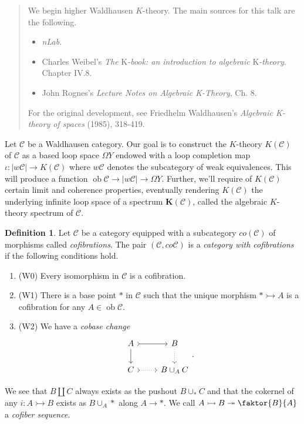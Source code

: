 \documentclass[10pt,letterpaper,cm]{nupset}
\theoremstyle{definition}
\newtheorem{definition}{Definition}
\theoremstyle{theorem}
\theoremstyle{remark}
\newcommand{\1}{\mathbf{1}}
\renewcommand{\c}{\mathscr{C}}
\newcommand{\0}{\vec 0}
\DeclareMathOperator{\ob}{ob}
\begin{document}
\begin{abstract}
We begin higher Waldhausen $K$-theory. The main sources for this talk are the following.
\begin{itemize}
\item \textit{nLab}.
\item Charles Weibel's \textit{The} K\textit{-book: an introduction to algebraic} K\textit{-theory}.  Chapter IV.8.
\item John Rognes's \textit{Lecture Notes on Algebraic K-Theory}, Ch. 8.
\end{itemize}
For the original development, see Friedhelm Waldhausen's \textit{Algebraic K-theory of spaces} (1985), 318-419. 
\end{abstract}


Let $\c$ be a Waldhausen category. Our goal is to construct the $K$-theory $K(\c)$ of $\c$ as a based loop space $\Omega Y$ endowed with a loop completion map $ \iota : |w \c| \to K(\c)$ where $w \c$ denotes the subcategory of weak equivalences. This will produce a function $\ob \c \to |w \c| \to \Omega Y$. Further, we'll require of $K(\c)$ certain limit and coherence properties, eventually rendering $K(\c)$ the underlying infinite loop space of a spectrum $\mathbf{K}(\c)$, called the algebraic $K$-theory spectrum of $\c$.


\begin{definition}
Let $\c$ be a category equipped with a subcategory $co(\c)$ of morphisms called \textit{cofibrations}. The pair $(\c, co\c)$ is a \textit{category with cofibrations} if the following conditions hold.
\begin{enumerate}
\item (W0) Every isomorphism in $\c$ is a cofibration.
\item (W1) There is a base point $\ast$ in $\c$ such that the unique morphism $\ast \rightarrowtail A$ is a cofibration for any $A \in \ob \c$.
\item (W2) We have a \textit{cobase change}
\[
\begin{tikzcd}
A \arrow[d] \arrow[r, tail] & B \arrow[d, dotted] \\
C \arrow[r, dotted, tail] & B \cup_A C
\end{tikzcd}.
\]
\end{enumerate}
\end{definition}


We see that $B \coprod C$ always exists as the pushout $B \cup_{\ast} C$ and that the cokernel of any $i : A \rightarrowtail B$ exists as $B \cup_A \ast$ along $A \to \ast$. We call $A \rightarrowtail  B \twoheadrightarrow \faktor{B}{A}$ a \textit{cofiber sequence}.
\end{document}
